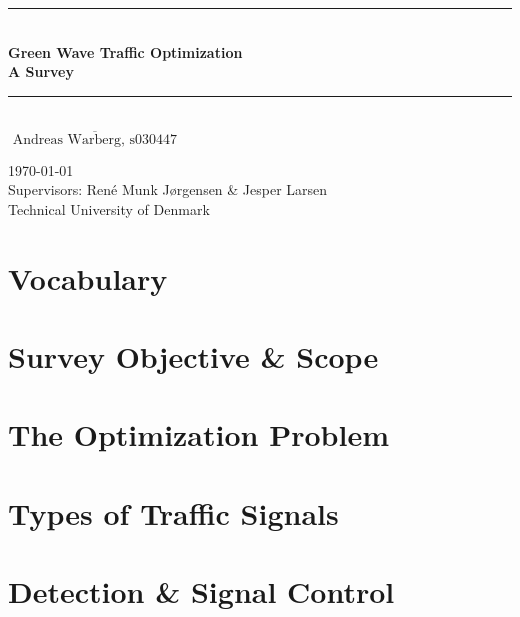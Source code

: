 \documentclass [a4paper, 11pt, titlepage] {article}
\date{A date}
\begin{document}
\setlength{\parindent}{4mm}

\begin{titlepage}
  \begin{center}
    \noindent\rule{\linewidth}{1mm}\\[4mm]
      {\sffamily\bfseries \Huge Green Wave Traffic Optimization}\\[1mm]
      {\sffamily\bfseries \Large
        A Survey}\\[0mm]
    \noindent\rule{\linewidth}{1mm}\\[30mm]
    \large $\overline{\textrm{ Andreas Warberg, s030447 }}$


    \large \today \\[6mm]
    Supervisors: Ren\'{e} Munk Jørgensen \& Jesper Larsen \\[3mm]
    Technical University of Denmark
  \end{center}
\end{titlepage}

\newpage
{}
\tableofcontents
\newpage
{}



\newpage

\section{Vocabulary}


\section{Survey Objective \& Scope}


\section{The Optimization Problem}


\section{Types of Traffic Signals}


\section{Detection \& Signal Control}

\end{document}
